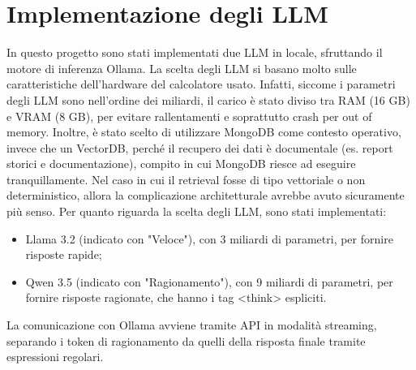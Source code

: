\documentclass[10pt,a4paper]{article}
\begin{document}
    \section{Implementazione degli LLM}
    In questo progetto sono stati implementati due LLM in locale, sfruttando il motore di inferenza Ollama. La scelta degli LLM si basano molto sulle
    caratteristiche dell'hardware del calcolatore usato. Infatti, siccome i parametri degli LLM sono nell'ordine dei miliardi, il carico è stato diviso tra RAM (16 GB) e VRAM (8 GB),
    per evitare rallentamenti e soprattutto crash per out of memory.
    Inoltre, è stato scelto di utilizzare MongoDB come contesto operativo, invece che un VectorDB, perché il recupero dei dati è documentale (es. report
    storici e documentazione), compito in cui MongoDB riesce ad eseguire tranquillamente. Nel caso in cui il retrieval fosse di tipo vettoriale o non
    deterministico, allora la complicazione architetturale avrebbe avuto sicuramente più senso.
    Per quanto riguarda la scelta degli LLM, sono stati implementati:
    \begin{itemize}
        \item Llama 3.2 (indicato con "Veloce"), con 3 miliardi di parametri, per fornire risposte rapide;
        \item Qwen 3.5 (indicato con "Ragionamento"), con 9 miliardi di parametri, per fornire risposte ragionate, che hanno i tag <think> espliciti.
    \end{itemize}
    La comunicazione con Ollama avviene tramite API in modalità streaming, separando i token di ragionamento da quelli della risposta finale tramite
    espressioni regolari.
\end{document}
